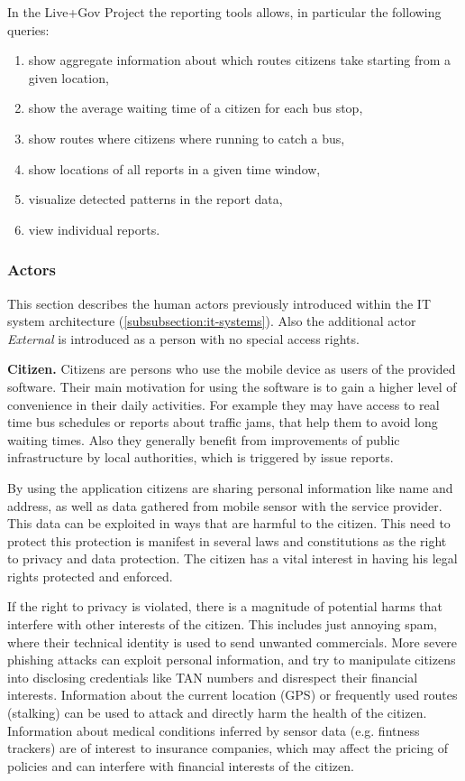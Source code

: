 In the Live+Gov Project the reporting tools allows, in particular the following queries:
\begin{enumerate}
\item show aggregate information about which routes citizens take starting from a given location,
\item show the average waiting time of a citizen for each bus stop,
\item show routes where citizens where running to catch a bus,
\item show locations of all reports in a given time window,
\item visualize detected patterns in the report data,
\item view individual reports.
\end{enumerate}

\subsubsection{Actors}
\label{subsubsection:humans}

This section describes the human actors previously introduced within the IT system architecture (\ref{subsubsection:it-systems}).
Also the additional actor \textit{External} is introduced as a person with no special access rights.

\textbf{Citizen.}
Citizens are persons who use the mobile device as users of the provided software.
Their main motivation for using the software is to gain a higher level of convenience in their daily activities. For example they may have access to real time bus schedules or reports about traffic jams, that help them to avoid long waiting times.
Also they generally benefit from improvements of public infrastructure by local authorities, which is triggered by issue reports.

By using the application citizens are sharing personal information like name and address, as well as data gathered from mobile sensor with the service provider.
This data can be exploited in ways that are harmful to the citizen.
This need to protect this protection is manifest in several laws and constitutions as the right to privacy and data protection.
The citizen has a vital interest in having his legal rights protected and enforced.

If the right to privacy is violated, there is a magnitude of potential harms that interfere with other interests of the citizen.
This includes just annoying spam, where their technical identity is used to send unwanted commercials.
More severe phishing attacks can exploit personal information, and try to manipulate citizens into disclosing credentials like TAN numbers and disrespect their financial interests.
Information about the current location (GPS) or frequently used routes (stalking) can be used to attack and directly harm the health of the citizen.
Information about medical conditions inferred by sensor data (e.g. fintness trackers) are of interest to insurance companies, which may affect the pricing of policies and can interfere with financial interests of the citizen.

